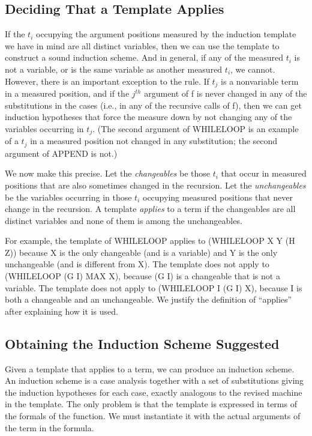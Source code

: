 \documentclass[10pt]{book}
\begin{document}
\subsection{Deciding That a Template Applies}
If the $t_{i}$ occupying the argument positions measured by the
induction template we have in mind
are all distinct variables, then we can use the template
to construct a sound induction scheme.
And in general, if any of the measured $t_{i}$ is not a variable,
or is the same variable as another measured  $t_{i}$, we
cannot.  However, there is an important exception to the rule.
If $t_{j}$ is a nonvariable term in a measured position, and if the $j^{th}$ argument of f is never
changed in any of the substitutions in the cases (i.e., in any of
the recursive calls of f), then we can get
induction hypotheses that force the measure  down by not
changing any of the variables occurring in $t_{j}$.  (The second
argument of WHILELOOP is an example of a $t_{j}$ in a
measured position not changed in any substitution; the second
argument of APPEND is not.)

We now make this precise.  Let the \emph{changeables} be those $t_{i}$ that occur
in measured positions that are also sometimes changed in the recursion.
Let the \emph{unchangeables} be the variables occurring in those $t_{i}$
occupying measured positions that never change in the recursion.
A template \emph{applies} to a term if the changeables are all distinct variables and none of
them is among the unchangeables.

For example, the template of WHILELOOP applies to (WHILELOOP X Y (H Z))
because X is the only changeable (and is a variable) and Y is the only
unchangeable (and is different from X).  The template does not apply to
(WHILELOOP (G I) MAX X), because (G I) is a changeable that is not a variable.
The template does not apply to (WHILELOOP I (G I) X), because I is both a
changeable and an unchangeable.
We justify the definition of ``applies'' after explaining how it is used.

\subsection{Obtaining the Induction Scheme Suggested}
Given  a template that applies to a term,
we can produce an induction scheme.  An induction scheme is
a case analysis together with a set of substitutions giving
the induction hypotheses for each case, exactly analogous to
the revised machine in the template.  The only problem is
that the template is expressed in terms of the formals of
the function.  We must instantiate it with the actual
arguments of the term in the formula. 
\end{document}

